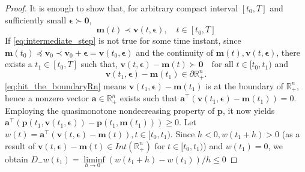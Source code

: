 \documentclass[letterpaper, 10 pt, journal, twoside]{IEEEtran}
\theoremstyle{plain}
\newcommand{\myvar}[1]{\bm{#1}}
\begin{document}
\begin{proof}
 	It is enough to show that, for arbitrary compact interval $ [t_0,T]$  and sufficiently small $ \myvar{\epsilon}\succ \myvar{0} $, 
 	\begin{equation}\label{eq:intermediate_step}
 	\myvar{m}(t) \prec \myvar{v}(t,\myvar{\epsilon}), \quad t\in [t_0,T]
 	\end{equation}
 	If \eqref{eq:intermediate_step} is not true for some time instant, since  $  \myvar{m}(t_0) \preceq \myvar{v}_0 \prec \myvar{v}_0 + \myvar{\epsilon}= \myvar{v}(t_0,\myvar{\epsilon}) $ and the continuity of $ \myvar{m}(t), \myvar{v}(t,\myvar{\epsilon}) $, there exists a $ t_1 \in [t_0, T]$ such that,  $  \myvar{v}(t,\myvar{\epsilon}) - \myvar{m}(t) \succ \myvar{0}  \quad \text{for all } t \in [t_0,t_1)$
 	and
 	\begin{equation} \label{eq:hit_the_boundaryRn}
 	    \myvar{v}(t_1,\myvar{\epsilon}) - \myvar{m}(t_1) \in \partial \mathbb{R}^n_{+}   .
 	\end{equation}
 	\eqref{eq:hit_the_boundaryRn} means $\myvar{v}(t_1,\myvar{\epsilon}) - \myvar{m}(t_1)$ is at the boundary of $\mathbb{R}^n_{+}$, hence  a nonzero vector $ \myvar{a} \in \mathbb{R}^{n}_{+}$ exists such that $ \myvar{a}^\top (\myvar{v}(t_1,\myvar{\epsilon}) - \myvar{m}(t_1))=0. $ Employing the quasimonotone nondecreasing property of $ \myvar{p} $, it now yields $\myvar{a}^\top (\myvar{p}(t_1,\myvar{v}(t_1,\myvar{\epsilon})) - \myvar{p}(t_1,\myvar{m}(t_1))) \ge 0.$
 	Let $ w(t) = \myvar{a}^\top (\myvar{v}(t,\myvar{\epsilon}) - \myvar{m}(t)), t\in [t_0, t_1) $. Since $ h <0, w(t_1+h) >0 $ (as a result of $ \myvar{v}(t,\myvar{\epsilon}) - \myvar{m}(t) \in Int(\mathbb{R}^{n}_{+}) $ for $ t \in [t_0,t_1) $) and $ w(t_1) = 0 $, we obtain $ 	D_{-} w(t_1) = \underset{h\to 0^{-}}{\liminf} ( w(t_1+h) - w(t_1))/h \le 0$
 	

\end{proof}
\end{document}

